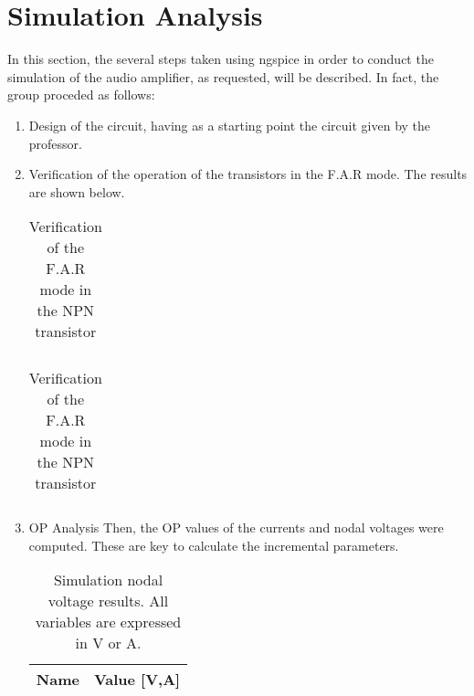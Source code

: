 \section{Simulation Analysis}\label{section:sim}
 
In this section, the several steps taken using ngspice in order to conduct the simulation of the audio amplifier, as requested, will be described.
In fact, the group proceded as follows:

\begin{enumerate}
\item Design of the circuit, having as a starting point the circuit given by the professor.

\item Verification of the operation of the transistors in the F.A.R mode. The results are shown below.

\begin{table}[ht]
  \centering
  \begin{tabular}{|l|r|}
    \hline    
   
     \end{tabular}
  \caption{Verification of the F.A.R mode in the NPN transistor}
 
\end{table}


\begin{table}[ht]
  \centering
  \begin{tabular}{|l|r|}
    \hline    
   
     \end{tabular}
  \caption{Verification of the F.A.R mode in the NPN transistor}
    
\end{table}



\item OP Analysis
     Then, the OP values of the currents and nodal voltages were computed. These are key to calculate the incremental parameters.
     
 \begin{table}[ht]

  \centering
  \begin{tabular}{|l|r|}
    \hline    
    {\bf Name} & {\bf Value [V,A]} \\ \hline
    
  \end{tabular}
  \caption{Simulation nodal voltage results. All variables are expressed in V or A.} 
\end{table}
     
     
  

\end{enumerate}
